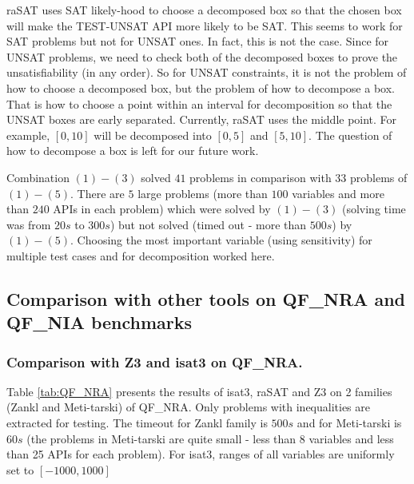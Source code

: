 \documentclass[runningheads,a4paper,oribibl]{llncs}
\begin{document}
raSAT uses SAT likely-hood to choose a decomposed box so that the chosen box will make the TEST-UNSAT API more likely to be SAT. This seems to work for SAT problems but not for UNSAT ones. In fact, this is not the case. Since for UNSAT problems, we need to check both of the decomposed boxes to prove the unsatisfiability (in any order). So for UNSAT constraints, it is not the problem of how to choose a decomposed box, but the problem of how to decompose a box. That is how to choose a point within an interval for decomposition so that the UNSAT boxes are early separated. Currently, raSAT uses the middle point. For example, $[0, 10]$ will be decomposed into $[0, 5]$ and $[5, 10]$. The question of how to decompose a box is left for our future work.

Combination $(1)-(3)$ solved $41$ problems in comparison with $33$ problems of $(1)-(5)$. There are $5$ large problems (more than $100$ variables and more than $240$ APIs in each problem) which were solved by $(1)-(3)$ (solving time was from $20s$ to $300s$) but not solved (timed out - more than $500s$) by $(1)-(5)$. Choosing the most important variable (using sensitivity) for multiple test cases and for decomposition worked here.

\begin{table*}[t]
\centering
{}
    \medskip
   	\caption{Experiments of strategies on Zankl family}
   	\label{tab:strategies-zankl}
\end{table*}

\subsection {Comparison with other tools on QF\_NRA and QF\_NIA benchmarks} 
\label{sec:comparisons}
\subsubsection{Comparison with Z3 and isat3 on QF\_NRA.}
Table \ref{tab:QF_NRA} presents the results of isat3, raSAT and Z3 on 2 families (Zankl and Meti-tarski) of QF\_NRA. Only problems with inequalities are extracted for testing. The timeout for Zankl family is $500s$ and for Meti-tarski is $60s$ (the problems in Meti-tarski are quite small - less than 8 variables and less than 25 APIs for each problem). For isat3, ranges of all variables are uniformly set to $[-1000, 1000]$
\end{document}

